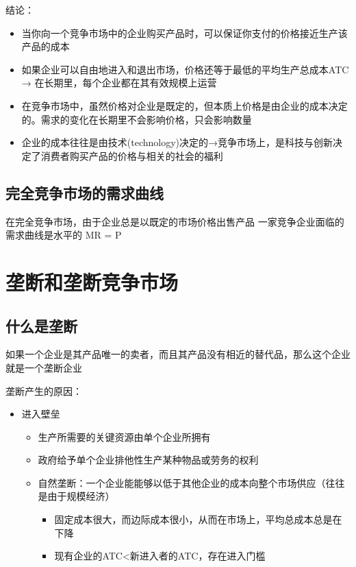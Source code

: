 \documentclass[12pt, a4paper]{article}
\begin{document}
结论：
\begin{itemize}
  \item 当你向一个竞争市场中的企业购买产品时，可以保证你支付的价格接近生产该产品的成本
  \item 如果企业可以自由地进入和退出市场，价格还等于最低的平均生产总成本ATC → 在长期里，每个企业都在其有效规模上运营
  \item 在竞争市场中，虽然价格对企业是既定的，但本质上价格是由企业的成本决定的。需求的变化在长期里不会影响价格，只会影响数量
  \item 企业的成本往往是由技术(technology)决定的→竞争市场上，是科技与创新决定了消费者购买产品的价格与相关的社会的福利
\end{itemize}

\subsection{完全竞争市场的需求曲线}
在完全竞争市场，由于企业总是以既定的市场价格出售产品
一家竞争企业面临的需求曲线是水平的 MR = P

\newpage

\section{垄断和垄断竞争市场}

\subsection{什么是垄断}
如果一个企业是其产品唯一的卖者，而且其产品没有相近的替代品，那么这个企业就是一个垄断企业

垄断产生的原因：
\begin{itemize}
  \item 进入壁垒
  \begin{itemize}
    \item 生产所需要的关键资源由单个企业所拥有
    \item 政府给予单个企业排他性生产某种物品或劳务的权利
    \item 自然垄断：一个企业能能够以低于其他企业的成本向整个市场供应（往往是由于规模经济）
    \begin{itemize}
      \item 固定成本很大，而边际成本很小，从而在市场上，平均总成本总是在下降
      \item 现有企业的ATC<新进入者的ATC，存在进入门槛
    \end{itemize}    
  \end{itemize}
\end{itemize}
\end{document}
